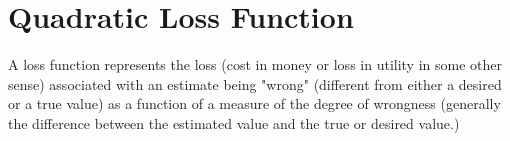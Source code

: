 \section{Quadratic Loss Function}

A loss function represents the loss (cost in money or loss in utility in some other sense) associated with an estimate being "wrong" (different from either a desired or a true value) as a function of a measure of the degree of wrongness (generally the difference between the estimated value and the true or desired value.)

